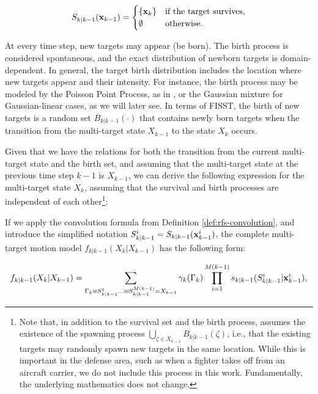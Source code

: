 \begin{equation}
    S_{k|k-1}(\vecat{x}{k-1}) = \begin{cases}
        \{\vecat{x}{k}\} & \text{if the target survives}, \\
        \emptyset & \text{otherwise}.
    \end{cases}
\end{equation}

At every time step, new targets may appear (be born). The birth process is considered spontaneous, and the exact distribution of newborn targets is domain-dependent. In general, the target birth distribution includes the location where new targets appear and their intensity. For instance, the birth process may be modeled by the Poisson Point Process, as in \cite{garcia-fernandezPoissonMultiBernoulliMixture2018}, or the Gaussian mixture for Gaussian-linear cases, as we will later see. In terms of FISST, the birth of new targets is a random set $B_{k|k-1}(\cdot)$ that contains newly born targets when the transition from the multi-target state $X_{k-1}$ to the state $X_{k}$ occurs.

Given that we have the relations for both the transition from the current multi-target state and the birth set, and assuming that the multi-target state at the previous time step $k-1$ is $X_{k-1}$, we can derive the following expression for the multi-target state $X_k$, assuming that the survival and birth processes are independent of each other\footnote{
Note that, in addition to the survival set and the birth process, \cite{voGaussianMixtureProbability2006} assumes the existence of the spawning process $\bigcup_{\zeta \in X_{k-1}} B_{k|k-1}(\zeta)$, i.e., that the existing targets may randomly spawn new targets in the same location. While this is important in the defense area, such as when a fighter takes off from an aircraft carrier, we do not include this process in this work. Fundamentally, the underlying mathematics does not change.}:

If we apply the convolution formula from Definition \ref{def:rfs-convolution}, and introduce the simplified notation $S_{k|k-1}^i = S_{k|k-1}(\svecat{x}{k-1}{i})$, the complete multi-target motion model $f_{k|k-1}(X_k | X_{k-1})$ has the following form:

\begin{equation}
    f_{k|k-1}(X_k | X_{k-1}) = 
    \sum_{
        \Gamma_k \uplus S_{k|k-1}^1 \ldots \uplus S_{k|k-1}^{M(k-1)} = X_{k-1}
    }
    \gamma_k(\Gamma_k)
    \prod_{i=1}^{M(k-1)}
    s_{k|k-1}(S_{k|k-1}^i | \svecat{x}{k-1}{i}),
\end{equation}


